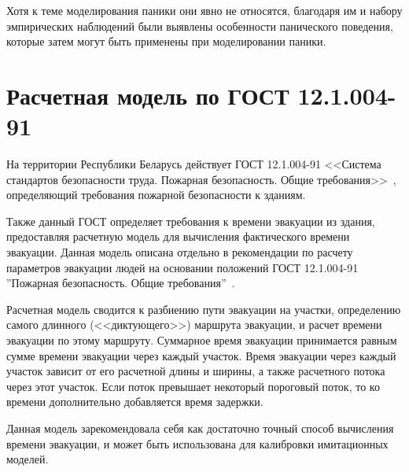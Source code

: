 Хотя к теме моделирования паники они явно не относятся, благодаря им и набору эмпирических наблюдений были выявлены особенности панического поведения,
которые затем могут быть применены при моделировании паники.


\section{Расчетная модель по ГОСТ 12.1.004-91}
\label{sub:overview:gost}

На территории Республики Беларусь действует ГОСТ 12.1.004-91 <<Система стандартов безопасности труда. Пожарная безопасность. Общие требования>>~\cite{gost_fire_safety},
определяющий требования пожарной безопасности к зданиям.

Также данный ГОСТ определяет требования к времени эвакуации из здания, предоставляя расчетную модель для вычисления фактического времени эвакуации.
Данная модель описана отдельно в рекомендации по расчету параметров эвакуации людей на основании положений ГОСТ 12.1.004-91 ''Пожарная безопасность. Общие требования''~\cite{model_gost}.

Расчетная модель сводится к разбиению пути эвакуации на участки, определению самого длинного (<<диктующего>>) маршрута эвакуации, и расчет времени эвакуации по этому маршруту.
Суммарное время эвакуации принимается равным сумме времени эвакуации через каждый участок.
Время эвакуации через каждый участок зависит от его расчетной длины и ширины, а также расчетного потока через этот участок.
Если поток превышает некоторый пороговый поток, то ко времени дополнительно добавляется время задержки.

Данная модель зарекомендовала себя как достаточно точный способ вычисления времени эвакуации, и может быть использована для калибровки имитационных моделей.






